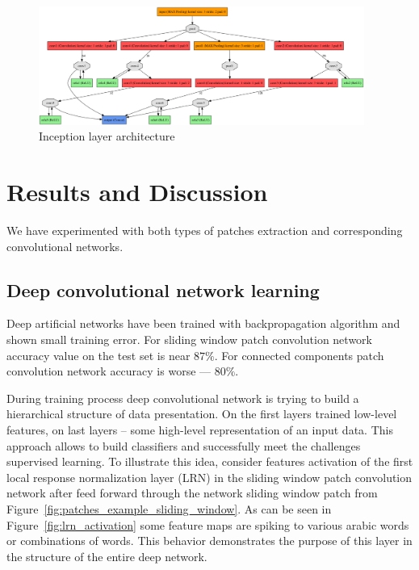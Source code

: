\documentclass[conference,a4paper]{ieeetran}
\begin{document}
\begin{figure}[!t]
	\center
 	\includegraphics[width=0.95\textwidth]{figures/inception.png}
  	\caption{Inception layer architecture}
  	\label{fig:inception}
\end{figure} 

\section{Results and Discussion}
\label{sec:results_and_description}

We have experimented with both types of patches extraction and corresponding convolutional networks. 

\subsection{Deep convolutional network learning}


Deep artificial networks have been trained with backpropagation algorithm \cite{CNN} and shown small training error. For sliding window patch convolution network accuracy value on the test set is near $87 \%$. For connected components patch convolution network accuracy is worse --- $80 \%$. 

During training process deep convolutional network is trying to build a hierarchical structure of data presentation. On the first layers trained low-level features, on last layers -- some high-level representation of an input data. This approach allows to build classifiers and successfully meet the challenges supervised learning. To illustrate this idea, consider features activation of the first local response normalization layer (LRN) in the sliding window patch convolution network after feed forward through the network sliding window patch from Figure~\ref{fig:patches_example_sliding_window}. As can be seen in Figure~\ref{fig:lrn_activation} some feature maps are spiking to various arabic words or combinations of words. This behavior demonstrates the purpose of this layer in the structure of the entire deep network.
\end{document}
